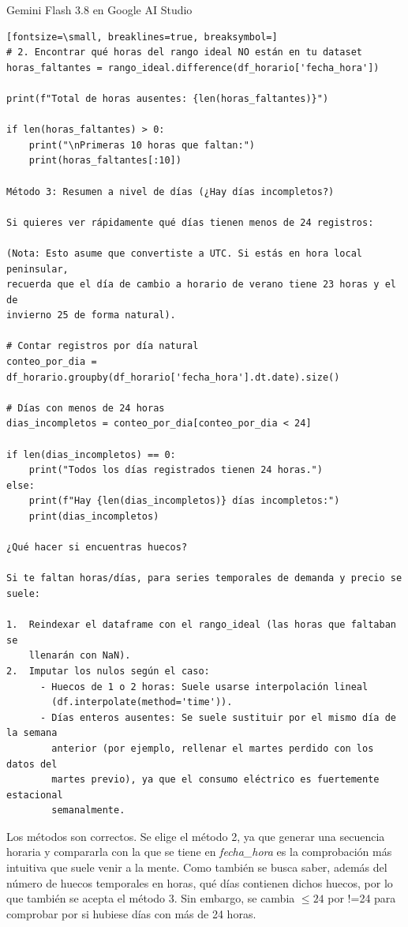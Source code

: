 \documentclass[12pt,a4paper,oneside]{book}
\begin{document}
\begin{iaresp}{Gemini Flash 3.8 en Google AI Studio}
\begin{Verbatim}[fontsize=\small, breaklines=true, breaksymbol=]
# 2. Encontrar qué horas del rango ideal NO están en tu dataset
horas_faltantes = rango_ideal.difference(df_horario['fecha_hora'])

print(f"Total de horas ausentes: {len(horas_faltantes)}")

if len(horas_faltantes) > 0:
    print("\nPrimeras 10 horas que faltan:")
    print(horas_faltantes[:10])

Método 3: Resumen a nivel de días (¿Hay días incompletos?)

Si quieres ver rápidamente qué días tienen menos de 24 registros:

(Nota: Esto asume que convertiste a UTC. Si estás en hora local peninsular,
recuerda que el día de cambio a horario de verano tiene 23 horas y el de
invierno 25 de forma natural).

# Contar registros por día natural
conteo_por_dia = df_horario.groupby(df_horario['fecha_hora'].dt.date).size()

# Días con menos de 24 horas
dias_incompletos = conteo_por_dia[conteo_por_dia < 24]

if len(dias_incompletos) == 0:
    print("Todos los días registrados tienen 24 horas.")
else:
    print(f"Hay {len(dias_incompletos)} días incompletos:")
    print(dias_incompletos)

¿Qué hacer si encuentras huecos?

Si te faltan horas/días, para series temporales de demanda y precio se suele:

1.  Reindexar el dataframe con el rango_ideal (las horas que faltaban se
    llenarán con NaN).
2.  Imputar los nulos según el caso:
      - Huecos de 1 o 2 horas: Suele usarse interpolación lineal
        (df.interpolate(method='time')).
      - Días enteros ausentes: Se suele sustituir por el mismo día de la semana
        anterior (por ejemplo, rellenar el martes perdido con los datos del
        martes previo), ya que el consumo eléctrico es fuertemente estacional
        semanalmente.
\end{Verbatim}
\end{iaresp}
\begin{iaanalisis}
Los métodos son correctos. Se elige el método 2, ya que generar una secuencia horaria y compararla con la que se tiene en \textit{fecha\_hora} es la comprobación más intuitiva que suele venir a la mente. Como también se busca saber, además del número de huecos temporales en horas, qué días contienen dichos huecos, por lo que también se acepta el método 3. Sin embargo, se cambia $\le 24$ por !=24 para comprobar por si hubiese días con más de 24 horas.
\end{iaanalisis}
\end{document}
